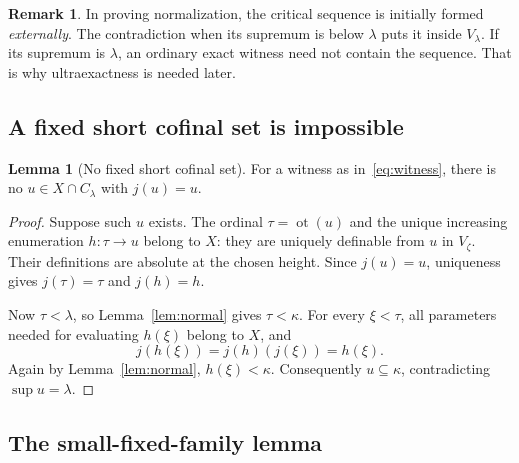 \documentclass[11pt,letterpaper]{article}
\theoremstyle{definition}
\newtheorem{lemma}[definition]{Lemma}
\newtheorem{remark}[definition]{Remark}
\numberwithin{equation}{section}
\newcommand{\ot}{\operatorname{ot}}
\newcommand{\C}{C_\lambda}
\begin{document}
\begin{remark}
In proving normalization, the critical sequence is initially formed \emph{externally}. The contradiction when its supremum is below $\lambda$ puts it inside $V_\lambda$. If its supremum is $\lambda$, an ordinary exact witness need not contain the sequence. That is why ultraexactness is needed later.
\end{remark}

\subsection{A fixed short cofinal set is impossible}

\begin{lemma}[No fixed short cofinal set]\label{lem:short}
For a witness as in~\eqref{eq:witness}, there is no $u\in X\cap\C$ with $j(u)=u$.
\end{lemma}
\begin{proof}
Suppose such $u$ exists. The ordinal $\tau=\ot(u)$ and the unique increasing enumeration $h:\tau\to u$ belong to $X$: they are uniquely definable from $u$ in $V_\zeta$. Their definitions are absolute at the chosen height. Since $j(u)=u$, uniqueness gives $j(\tau)=\tau$ and $j(h)=h$.

Now $\tau<\lambda$, so Lemma~\ref{lem:normal} gives $\tau<\kappa$. For every $\xi<\tau$, all parameters needed for evaluating $h(\xi)$ belong to $X$, and
\[
j(h(\xi))=j(h)(j(\xi))=h(\xi).
\]
Again by Lemma~\ref{lem:normal}, $h(\xi)<\kappa$. Consequently $u\subseteq\kappa$, contradicting $\sup u=\lambda$.
\end{proof}

\subsection{The small-fixed-family lemma}
\end{document}
